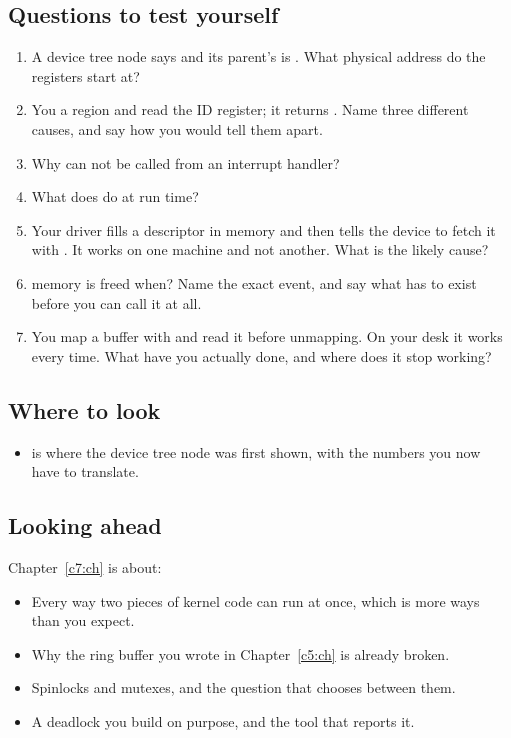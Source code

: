 \subsection*{Questions to test yourself}
\begin{enumerate}
  \item A device tree node says  and its parent's  is
    . What physical address do the registers start at?
  \item You  a region and read the ID register; it returns . Name
    three different causes, and say how you would tell them apart.
  \item Why can  not be called from an interrupt handler?
  \item What does  do at run time?
  \item Your driver fills a descriptor in memory and then tells the device to fetch it with
    . It works on one machine and not another. What is the likely cause?
  \item {} memory is freed when? Name the exact event, and say what has to exist
    before you can call it at all.
  \item You map a buffer with  and read it before
    unmapping. On your desk it works every time. What have you actually done, and where does it stop
    working?
\end{enumerate}

\subsection*{Where to look}
\begin{itemize}
  \item {} is where the device tree node was first shown, with the numbers you now
    have to translate.
\end{itemize}

\subsection*{Looking ahead}
Chapter~\ref{c7:ch} is about:
\begin{itemize}
  \item Every way two pieces of kernel code can run at once, which is more ways than you expect.
  \item Why the ring buffer you wrote in Chapter~\ref{c5:ch} is already broken.
  \item Spinlocks and mutexes, and the question that chooses between them.
  \item A deadlock you build on purpose, and the tool that reports it.
\end{itemize}
